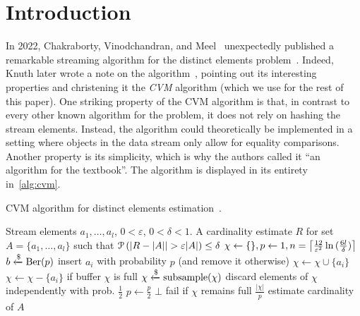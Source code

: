 \section{Introduction}
\label{sec:intro}

In 2022, Chakraborty, Vinodchandran, and Meel~\cite{chakraborty2022} unexpectedly published a remarkable streaming algorithm for the distinct elements problem~\cite{quanta}.
Indeed, Knuth later wrote a note on the algorithm~\cite{knuthnote}, pointing out its interesting properties and christening it the \emph{CVM} algorithm (which we use for the rest of this paper).
One striking property of the CVM algorithm is that, in contrast to every other known algorithm for the problem, it does not rely on hashing the stream elements.
Instead, the algorithm could theoretically be implemented in a setting where objects in the data stream only allow for equality comparisons.
Another property is its simplicity, which is why the authors called it ``an algorithm for the textbook''.
The algorithm is displayed in its entirety in~\cref{alg:cvm}.

\begin{algorithm}[h!]
	\caption{CVM algorithm for distinct elements estimation~\cite{chakraborty2022}.}\label{alg:cvm}
	\begin{algorithmic}[1]
  \Require Stream elements $a_1,\dots,a_l$, $0 < \varepsilon$, $0 < \delta < 1$.
  \Ensure A cardinality estimate $R$ for set $A = \{ a_1,\dots,a_l \}$ such that $\prob \left( |R - |A| | > \varepsilon |A| \right) \leq \delta$
  \State $\chi \gets \{\}, p \gets 1, n = \ceil*{\frac{12}{\varepsilon^2} \ln{(\frac{6l}{\delta})} }$
    \State $b \getsr \Ber(p)$ \Comment insert $a_i$ with probability $p$ (and remove it otherwise)
      \State $\chi \gets \chi \cup \{a_i\}$
    \Else
      \State $\chi \gets \chi - \{a_i\}$
    \EndIf
     \Comment if buffer $\chi$ is full
      \State $\chi \getsr \mathrm{subsample}(\chi)$ \Comment discard elements of $\chi$ independently with prob. $\frac{1}{2}$
      \State $p \gets \frac{p}{2}$
    \EndIf
      \Return $\bot$ \Comment fail if $\chi$ remains full
    \EndIf
  \EndFor
  \State \Return $\frac{|\chi|}{p}$ \Comment estimate cardinality of $A$
  \end{algorithmic}
\end{algorithm}

